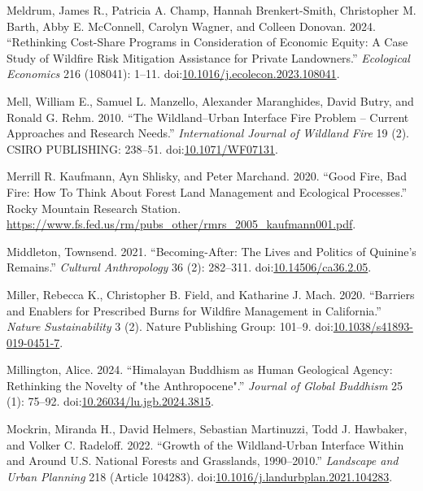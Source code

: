 \documentclass[
]{article}
\newlength{\cslhangindent}
\newenvironment{CSLReferences}[2] %
 {\begin{list}{}{%
  \setlength{\itemindent}{0pt}
  \setlength{\leftmargin}{0pt}
  \setlength{\parsep}{0pt}
  \ifodd #1
   \setlength{\leftmargin}{\cslhangindent}
   \setlength{\itemindent}{-1\cslhangindent}
  \fi
  \setlength{\itemsep}{#2\baselineskip}}}
 {\end{list}}
\begin{document}
\begin{CSLReferences}{1}{0}
Meldrum, James R., Patricia A. Champ, Hannah Brenkert-Smith, Christopher M. Barth, Abby E. McConnell, Carolyn Wagner, and Colleen Donovan. 2024. {``Rethinking Cost-Share Programs in Consideration of Economic Equity: {A} Case Study of Wildfire Risk Mitigation Assistance for Private Landowners.''} \emph{Ecological Economics} 216 (108041): 1--11. doi:\href{https://doi.org/10.1016/j.ecolecon.2023.108041}{10.1016/j.ecolecon.2023.108041}.

Mell, William E., Samuel L. Manzello, Alexander Maranghides, David Butry, and Ronald G. Rehm. 2010. {``The Wildland--Urban Interface Fire Problem -- Current Approaches and Research Needs.''} \emph{International Journal of Wildland Fire} 19 (2). CSIRO PUBLISHING: 238--51. doi:\href{https://doi.org/10.1071/WF07131}{10.1071/WF07131}.

Merrill R. Kaufmann, Ayn Shlisky, and Peter Marchand. 2020. {``Good {Fire}, {Bad Fire}: {How To Think About Forest Land Management} and {Ecological Processes}.''} Rocky Mountain Research Station. \url{https://www.fs.fed.us/rm/pubs_other/rmrs_2005_kaufmann001.pdf}.

Middleton, Townsend. 2021. {``Becoming-{After}: {The Lives} and {Politics} of {Quinine}'s {Remains}.''} \emph{Cultural Anthropology} 36 (2): 282--311. doi:\href{https://doi.org/10.14506/ca36.2.05}{10.14506/ca36.2.05}.

Miller, Rebecca K., Christopher B. Field, and Katharine J. Mach. 2020. {``Barriers and Enablers for Prescribed Burns for Wildfire Management in {California}.''} \emph{Nature Sustainability} 3 (2). Nature Publishing Group: 101--9. doi:\href{https://doi.org/10.1038/s41893-019-0451-7}{10.1038/s41893-019-0451-7}.

Millington, Alice. 2024. {``Himalayan {Buddhism} as {Human Geological Agency}: {Rethinking} the {Novelty} of "the {Anthropocene}".''} \emph{Journal of Global Buddhism} 25 (1): 75--92. doi:\href{https://doi.org/10.26034/lu.jgb.2024.3815}{10.26034/lu.jgb.2024.3815}.

Mockrin, Miranda H., David Helmers, Sebastian Martinuzzi, Todd J. Hawbaker, and Volker C. Radeloff. 2022. {``Growth of the Wildland-Urban Interface Within and Around {U}.{S}. {National Forests} and {Grasslands}, 1990--2010.''} \emph{Landscape and Urban Planning} 218 (Article 104283). doi:\href{https://doi.org/10.1016/j.landurbplan.2021.104283}{10.1016/j.landurbplan.2021.104283}.


\end{CSLReferences}
\end{document}
